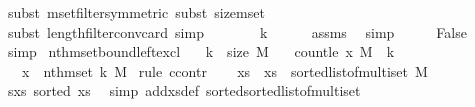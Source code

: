 \begin{isabellebody}
\ {\isacharparenleft}{\kern0pt}subst\ mset{\isacharunderscore}{\kern0pt}filter{\isacharbrackleft}{\kern0pt}symmetric{\isacharbrackright}{\kern0pt}{\isacharcomma}{\kern0pt}\ subst\ size{\isacharunderscore}{\kern0pt}mset{\isacharparenright}{\kern0pt}\isanewline
\ \ \ \ \isamarkupfalse%
\ {\isacharparenleft}{\kern0pt}subst\ length{\isacharunderscore}{\kern0pt}filter{\isacharunderscore}{\kern0pt}conv{\isacharunderscore}{\kern0pt}card{\isacharcomma}{\kern0pt}\ simp{\isacharparenright}{\kern0pt}\isanewline
\ \ \isamarkupfalse%
\ \isamarkupfalse%
\ {\isachardoublequoteopen}{\isachardot}{\kern0pt}{\isachardot}{\kern0pt}{\isachardot}{\kern0pt}\ {\isasymle}\ k{\isachardoublequoteclose}\isanewline
\ \ \ \ \isamarkupfalse%
\ assms\ \isamarkupfalse%
\ simp\isanewline
\ \ \isamarkupfalse%
\ \isamarkupfalse%
\ {\isachardoublequoteopen}False{\isachardoublequoteclose}\ \isamarkupfalse%
\ simp\isanewline
{}\isamarkupfalse%
%
\endisatagproof
{\isafoldproof}%
%
\isadelimproof
\isanewline
%
\endisadelimproof
\isanewline
{}\isamarkupfalse%
\ nth{\isacharunderscore}{\kern0pt}mset{\isacharunderscore}{\kern0pt}bound{\isacharunderscore}{\kern0pt}left{\isacharunderscore}{\kern0pt}excl{\isacharcolon}{\kern0pt}\isanewline
\ \ \ {\isachardoublequoteopen}k\ {\isacharless}{\kern0pt}\ size\ M{\isachardoublequoteclose}\isanewline
\ \ \ {\isachardoublequoteopen}count{\isacharunderscore}{\kern0pt}le\ x\ M\ {\isasymle}\ k{\isachardoublequoteclose}\isanewline
\ \ \ {\isachardoublequoteopen}x\ {\isacharless}{\kern0pt}\ nth{\isacharunderscore}{\kern0pt}mset\ k\ M{\isachardoublequoteclose}\isanewline
%
\isadelimproof
%
\endisadelimproof
%
\isatagproof
{}\isamarkupfalse%
\ {\isacharparenleft}{\kern0pt}rule\ ccontr{\isacharparenright}{\kern0pt}\isanewline
\ \ \isamarkupfalse%
\ xs\ \ {\isachardoublequoteopen}xs\ {\isacharequal}{\kern0pt}\ sorted{\isacharunderscore}{\kern0pt}list{\isacharunderscore}{\kern0pt}of{\isacharunderscore}{\kern0pt}multiset\ M{\isachardoublequoteclose}\isanewline
\ \ \isamarkupfalse%
\ s{\isacharunderscore}{\kern0pt}xs{\isacharcolon}{\kern0pt}\ {\isachardoublequoteopen}sorted\ xs{\isachardoublequoteclose}\ \isamarkupfalse%
\ {\isacharparenleft}{\kern0pt}simp\ add{\isacharcolon}{\kern0pt}xs{\isacharunderscore}{\kern0pt}def\ sorted{\isacharunderscore}{\kern0pt}sorted{\isacharunderscore}{\kern0pt}list{\isacharunderscore}{\kern0pt}of{\isacharunderscore}{\kern0pt}multiset{\isacharparenright}{\kern0pt}\isanewline

\end{isabellebody}
